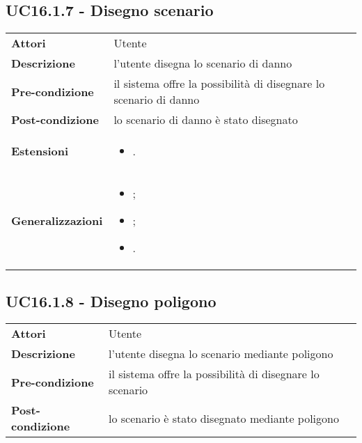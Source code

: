 \subsection{UC16.1.7 - Disegno scenario}
\label{sssec:UC16.1.7}
\def\arraystretch{1.5}
\begin{tabularx}{\textwidth}{l|p{}}
\rowcolor{I} \multicolumn{2}{c}{\color{white}\textbf{UC16.1.7 - Disegno scenario}} \\
\toprule
\endhead
\textbf{Attori} & Utente\\
\textbf{Descrizione} & l'utente disegna lo scenario di danno\\
\textbf{Pre-condizione} & il sistema offre la possibilità di disegnare lo scenario di danno\\
\textbf{Post-condizione} & lo scenario di danno è stato disegnato\\
\textbf{Estensioni} & \vspace{-1.2em}\begin{itemize}[leftmargin=*,noitemsep,nosep]
\item \nameref{sssec:UC16.1.11}.
\end{itemize}\\
\textbf{Generalizzazioni} & \vspace{-1.2em}\begin{itemize}[leftmargin=*,noitemsep,nosep]
	\item \nameref{sssec:UC16.1.8}; 
	\item \nameref{sssec:UC16.1.9}; 
	\item \nameref{sssec:UC16.1.10}.
	\end{itemize} \\
\bottomrule
\end{tabularx}
\subsection{UC16.1.8 - Disegno poligono}
\label{sssec:UC16.1.8}
\def\arraystretch{1.5}
\begin{tabularx}{\textwidth}{l|p{}}
\rowcolor{I} \multicolumn{2}{c}{\color{white}\textbf{UC16.1.8 - Disegno poligono}} \\
\toprule
\endhead
\textbf{Attori} & Utente\\
\textbf{Descrizione} & l'utente disegna lo scenario mediante poligono\\
\textbf{Pre-condizione} & il sistema offre la possibilità di disegnare lo scenario\\
\textbf{Post-condizione} & lo scenario è stato disegnato mediante poligono\\
\bottomrule
\end{tabularx}
